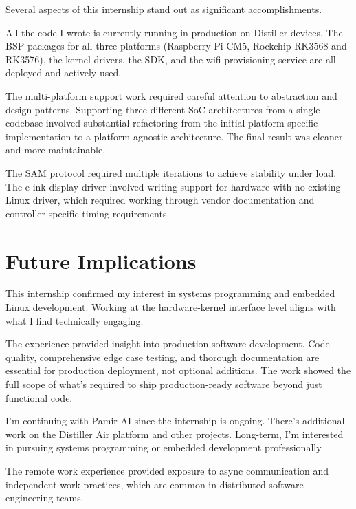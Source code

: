 \documentclass[12pt,a4paper]{report}
\begin{document}
Several aspects of this internship stand out as significant accomplishments.

\vspace{0.3cm}

All the code I wrote is currently running in production on Distiller devices. The BSP packages for all three platforms (Raspberry Pi CM5, Rockchip RK3568 and RK3576), the kernel drivers, the SDK, and the wifi provisioning service are all deployed and actively used.

\vspace{0.3cm}

The multi-platform support work required careful attention to abstraction and design patterns. Supporting three different SoC architectures from a single codebase involved substantial refactoring from the initial platform-specific implementation to a platform-agnostic architecture. The final result was cleaner and more maintainable.

\vspace{0.3cm}

The SAM protocol required multiple iterations to achieve stability under load. The e-ink display driver involved writing support for hardware with no existing Linux driver, which required working through vendor documentation and controller-specific timing requirements.

\section{Future Implications}

This internship confirmed my interest in systems programming and embedded Linux development. Working at the hardware-kernel interface level aligns with what I find technically engaging.

\vspace{0.3cm}

The experience provided insight into production software development. Code quality, comprehensive edge case testing, and thorough documentation are essential for production deployment, not optional additions. The work showed the full scope of what's required to ship production-ready software beyond just functional code.

\vspace{0.3cm}

I'm continuing with Pamir AI since the internship is ongoing. There's additional work on the Distiller Air platform and other projects. Long-term, I'm interested in pursuing systems programming or embedded development professionally.

\vspace{0.3cm}

The remote work experience provided exposure to async communication and independent work practices, which are common in distributed software engineering teams.
\end{document}
